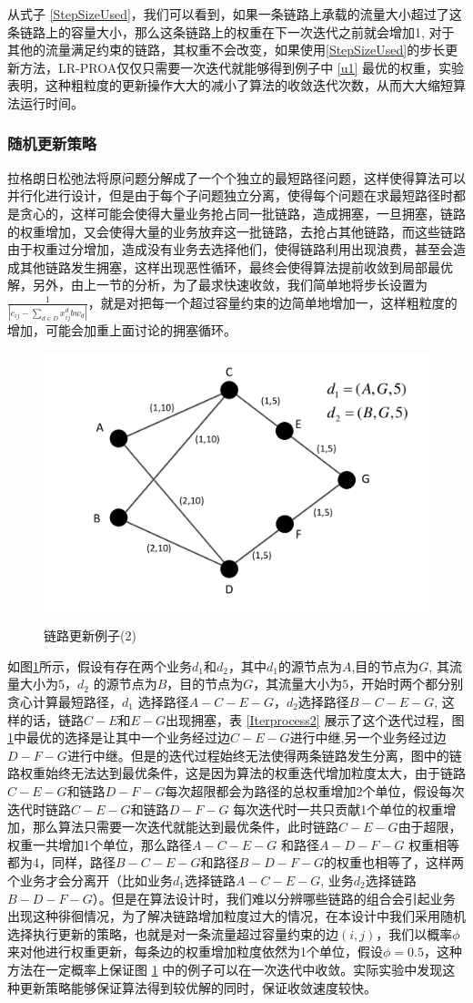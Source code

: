 从式子 \ref{StepSizeUsed}，我们可以看到，如果一条链路上承载的流量大小超过了这条链路上的容量大小，那么这条链路上的权重在下一次迭代之前就会增加1, 对于其他的流量满足约束的链路，其权重不会改变，如果使用\ref{StepSizeUsed}的步长更新方法，LR-PROA仅仅只需要一次迭代就能够得到例子中 \ref{u1} 最优的权重，实验表明，这种粗粒度的更新操作大大的减小了算法的收敛迭代次数，从而大大缩短算法运行时间。
\subsubsection{随机更新策略}

拉格朗日松弛法将原问题分解成了一个个独立的最短路径问题，这样使得算法可以并行化进行设计，但是由于每个子问题独立分离，使得每个问题在求最短路径时都是贪心的，这样可能会使得大量业务抢占同一批链路，造成拥塞，一旦拥塞，链路的权重增加，又会使得大量的业务放弃这一批链路，去抢占其他链路，而这些链路由于权重过分增加，造成没有业务去选择他们，使得链路利用出现浪费，甚至会造成其他链路发生拥塞，这样出现恶性循环，最终会使得算法提前收敛到局部最优解，另外，由上一节的分析，为了最求快速收敛，我们简单地将步长设置为$\frac{1}{|c_{ij}-\sum\limits_{d \in D} x_{ij}^d bw_d|}$，就是对把每一个超过容量约束的边简单地增加一，这样粗粒度的增加，可能会加重上面讨论的拥塞循环。
\begin{figure}
\setlength{\belowcaptionskip}{-0.1cm}
\begin{center}
{\includegraphics[width=0.4 \textwidth]{figures/random.pdf}}
\end{center}
\caption{{\footnotesize{链路更新例子(2)}}}
\label{u2}
\end{figure}
如图\ref{u2}所示，假设有存在两个业务$d_1$和$d_2$，其中$d_1$的源节点为$A$,目的节点为$G$, 其流量大小为$5$，$d_2$ 的源节点为$B$，目的节点为$G$，其流量大小为$5$，开始时两个都分别贪心计算最短路径，$d_1$ 选择路径$A-C-E-G$，$d_2$选择路径$B-C-E-G$, 这样的话，链路$C-E$和$E-G$出现拥塞，表 \ref{Iterprocess2} 展示了这个迭代过程，图 \ref{u2}中最优的选择是让其中一个业务经过边$C-E-G$进行中继,另一个业务经过边$D-F-G$进行中继。但是的迭代过程始终无法使得两条链路发生分离，图中的链路权重始终无法达到最优条件，这是因为算法的权重迭代增加粒度太大，由于链路$C-E-G$和链路$D-F-G$每次超限都会为路径的总权重增加2个单位，假设每次迭代时链路$C-E-G$和链路$D-F-G$ 每次迭代时一共只贡献1个单位的权重增加，那么算法只需要一次迭代就能达到最优条件，此时链路$C-E-G$由于超限，权重一共增加1个单位，那么路径$A-C-E-G$ 和路径$A-D-F-G$ 权重相等都为4，同样，路径$B-C-E-G$和路径$B-D-F-G$的权重也相等了，这样两个业务才会分离开（比如业务$d_1$选择链路$A-C-E-G$, 业务$d_2$选择链路$B-D-F-G$）。但是在算法设计时，我们难以分辨哪些链路的组合会引起业务出现这种徘徊情况，为了解决链路增加粒度过大的情况，在本设计中我们采用随机选择执行更新的策略，也就是对一条流量超过容量约束的边$(i,j)$，我们以概率$\phi$ 来对他进行权重更新，每条边的权重增加粒度依然为1个单位，假设$\phi=0.5$，这种方法在一定概率上保证图 \ref{u2} 中的例子可以在一次迭代中收敛。实际实验中发现这种更新策略能够保证算法得到较优解的同时，保证收敛速度较快。
